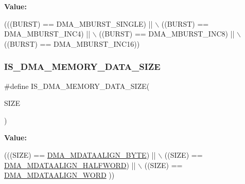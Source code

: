 {\bfseries Value\+:}
\begin{DoxyCode}
(((BURST) == DMA\_MBURST\_SINGLE) || \(\backslash\)
                                    ((BURST) == DMA\_MBURST\_INC4)   || \(\backslash\)
                                    ((BURST) == DMA\_MBURST\_INC8)   || \(\backslash\)
                                    ((BURST) == DMA\_MBURST\_INC16))
\end{DoxyCode}
\mbox{\label{group___d_m_a___private___macros_gac9e3748cebcb16d4ae4206d562bc804c}} 
\subsubsection{\texorpdfstring{I\+S\+\_\+\+D\+M\+A\+\_\+\+M\+E\+M\+O\+R\+Y\+\_\+\+D\+A\+T\+A\+\_\+\+S\+I\+ZE}{IS\_DMA\_MEMORY\_DATA\_SIZE}}
{\footnotesize\ttfamily \#define I\+S\+\_\+\+D\+M\+A\+\_\+\+M\+E\+M\+O\+R\+Y\+\_\+\+D\+A\+T\+A\+\_\+\+S\+I\+ZE(\begin{DoxyParamCaption}\item[{}]{S\+I\+ZE }\end{DoxyParamCaption})}

{\bfseries Value\+:}
\begin{DoxyCode}
(((SIZE) == \hyperlink{group___d_m_a___memory__data__size_ga9ed07bddf736298eba11508382ea4d51}{DMA\_MDATAALIGN\_BYTE})     || \(\backslash\)
                                       ((SIZE) == \hyperlink{group___d_m_a___memory__data__size_ga2c7355971c0da34a7ffe50ec87403071}{DMA\_MDATAALIGN\_HALFWORD}) || \(\backslash\)
                                       ((SIZE) == \hyperlink{group___d_m_a___memory__data__size_ga8812da819f18c873249074f3920220b2}{DMA\_MDATAALIGN\_WORD} ))
\end{DoxyCode}
\mbox{\label{group___d_m_a___private___macros_gaa880f39d499d1e80449cf80381e4eb67}} 
